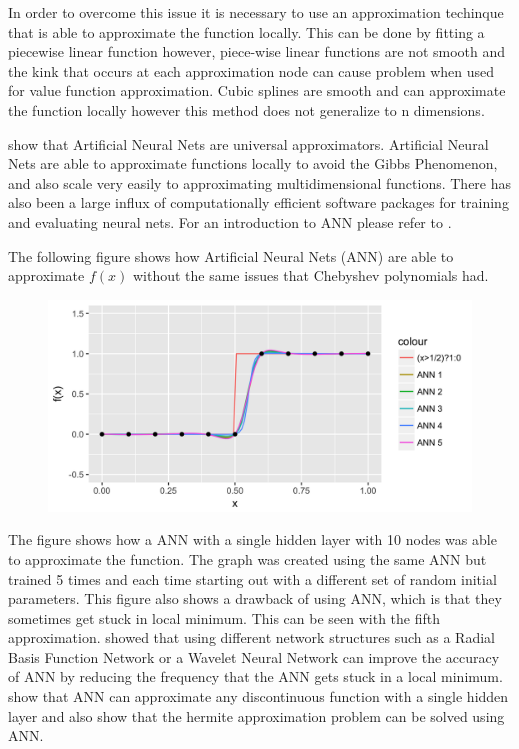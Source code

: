 \documentclass[12pt]{article}
\begin{document}
In order to overcome this issue it is necessary to use an approximation techinque that is able to approximate the function locally. This can be done by fitting a piecewise linear function however, piece-wise linear functions are not smooth and the kink that occurs at each approximation node can cause problem when used for value function approximation. Cubic splines are smooth and can approximate the function locally however this method does not generalize to n dimensions.

\cite{ann_uni} show that Artificial Neural Nets are universal approximators. Artificial Neural Nets are able to approximate functions locally to avoid the Gibbs Phenomenon, and also scale very easily to approximating multidimensional functions. There has also been a large influx of computationally efficient software packages for training and evaluating neural nets. For an introduction to ANN please refer to \citet{ann_tutorial}.

The following figure shows how Artificial Neural Nets (ANN) are able to approximate $f(x)$ without the same issues that Chebyshev polynomials had.

\begin{figure}[H]
  \centering
  \includegraphics[scale=1]{plot_ANN_Ind_Func}
\end{figure}

The figure shows how a ANN with a single hidden layer with 10 nodes was able to approximate the function. The graph was created using the same ANN but trained 5 times and each time starting out with a different set of random initial parameters. This figure also shows a drawback of using ANN, which is that they sometimes get stuck in local minimum. This can be seen with the fifth approximation. \citet{ann_radial} showed that using different network structures such as a Radial Basis Function Network or a Wavelet Neural Network can improve the accuracy of ANN by reducing the frequency that the ANN gets stuck in a local minimum. \citet{ann_disc} show that ANN can approximate any discontinuous function with a single hidden layer and \citet{ann_herm} also show that the hermite approximation problem can be solved using ANN.
\end{document}
